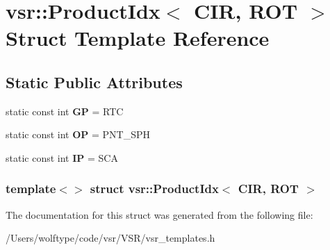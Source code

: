 \hypertarget{structvsr_1_1_product_idx_3_01_c_i_r_00_01_r_o_t_01_4}{\section{vsr\-:\-:Product\-Idx$<$ C\-I\-R, R\-O\-T $>$ Struct Template Reference}
\label{structvsr_1_1_product_idx_3_01_c_i_r_00_01_r_o_t_01_4}
}
\subsection*{Static Public Attributes}
\begin{DoxyCompactItemize}
\item 
\hypertarget{structvsr_1_1_product_idx_3_01_c_i_r_00_01_r_o_t_01_4_a14f1d9b752eb3edca0105975cf8d89d1}{static const int {\bfseries G\-P} = R\-T\-C}\label{structvsr_1_1_product_idx_3_01_c_i_r_00_01_r_o_t_01_4_a14f1d9b752eb3edca0105975cf8d89d1}

\item 
\hypertarget{structvsr_1_1_product_idx_3_01_c_i_r_00_01_r_o_t_01_4_ad3b365e1ff197bad9ac12dc98bec8e0a}{static const int {\bfseries O\-P} = P\-N\-T\-\_\-\-S\-P\-H}\label{structvsr_1_1_product_idx_3_01_c_i_r_00_01_r_o_t_01_4_ad3b365e1ff197bad9ac12dc98bec8e0a}

\item 
\hypertarget{structvsr_1_1_product_idx_3_01_c_i_r_00_01_r_o_t_01_4_ad3559003473e9269269be0082ab11c6d}{static const int {\bfseries I\-P} = S\-C\-A}\label{structvsr_1_1_product_idx_3_01_c_i_r_00_01_r_o_t_01_4_ad3559003473e9269269be0082ab11c6d}

\end{DoxyCompactItemize}
\subsubsection*{template$<$$>$ struct vsr\-::\-Product\-Idx$<$ C\-I\-R, R\-O\-T $>$}



The documentation for this struct was generated from the following file\-:\begin{DoxyCompactItemize}
\item 
/\-Users/wolftype/code/vsr/\-V\-S\-R/vsr\-\_\-templates.\-h\end{DoxyCompactItemize}

